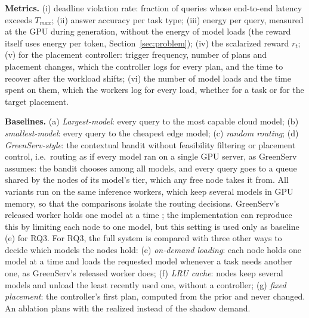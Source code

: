 \textbf{Metrics.}
(i) deadline violation rate: fraction of queries whose end-to-end latency exceeds $T_{max}$; (ii) answer accuracy per task type; (iii) energy per query, measured at the GPU during generation, without the energy of model loads (the reward itself uses energy per token, Section~\ref{sec:problem}); (iv) the scalarized reward $r_t$; (v) for the placement controller: trigger frequency, number of plans and placement changes, which the controller logs for every plan, and the time to recover after the workload shifts; (vi) the number of model loads and the time spent on them, which the workers log for every load, whether for a task or for the target placement.

\textbf{Baselines.}
(a) \emph{Largest-model}: every query to the most capable cloud model; (b) \emph{smallest-model}: every query to the cheapest edge model; (c) \emph{random routing}; (d) \emph{GreenServ-style}: the contextual bandit without feasibility filtering or placement control, i.e.\ routing as if every model ran on a single GPU server, as GreenServ assumes: the bandit chooses among all models, and every query goes to a queue shared by the nodes of its model's tier, which any free node takes it from.
All variants run on the same inference workers, which keep several models in GPU memory, so that the comparisons isolate the routing decisions. GreenServ's released worker holds one model at a time \cite{greenserv_code}; the implementation can reproduce this by limiting each node to one model, but this setting is used only as baseline (e) for RQ3.
For RQ3, the full system is compared with three other ways to decide which models the nodes hold: (e) \emph{on-demand loading}: each node holds one model at a time and loads the requested model whenever a task needs another one, as GreenServ's released worker does; (f) \emph{LRU cache}: nodes keep several models and unload the least recently used one, without a controller; (g) \emph{fixed placement}: the controller's first plan, computed from the prior and never changed. An ablation plans with the realized instead of the shadow demand.

